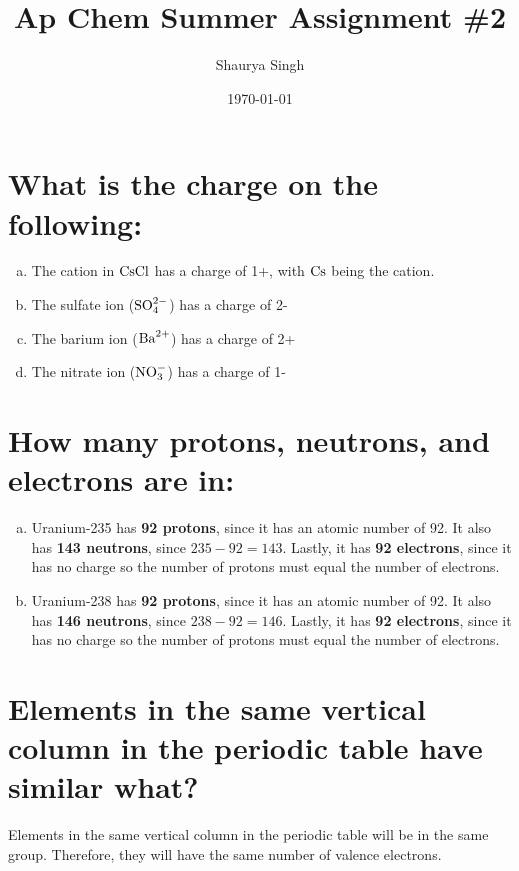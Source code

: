 \documentclass[11pt]{article}
\author{Shaurya Singh}
\date{\today}
\title{Ap Chem Summer Assignment \#2}
\begin{document}
\maketitle

\section{What is the charge on the following:}
\label{sec:org161f669}
\begin{enumerate}[(a)]
\item The cation in \(\ce{CsCl}\) has a charge of 1+, with \(\ce{Cs}\) being the cation.
\item The sulfate ion (\(\ce{SO^{2-}4}\)) has a charge of 2-
\item The barium ion (\(\ce{Ba^{2+}}\)) has a charge of 2+
\item The nitrate ion (\(\ce{NO^-3}\)) has a charge of 1-
\end{enumerate}

\section{How many protons, neutrons, and electrons are in:}
\label{sec:orga434b10}
\begin{enumerate}[(a)]
\item Uranium-235 has \textbf{92 protons}, since it has an atomic number of 92. It also has \textbf{143 neutrons}, since \(235-92=143\). Lastly, it has \textbf{92 electrons}, since it has no charge so the number of protons must equal the number of electrons.
\item Uranium-238 has \textbf{92 protons}, since it has an atomic number of 92. It also has \textbf{146 neutrons}, since \(238-92=146\). Lastly, it has \textbf{92 electrons}, since it has no charge so the number of protons must equal the number of electrons.
\end{enumerate}

\section{Elements in the same vertical column in the periodic table have similar what?}
\label{sec:orgf81f922}
Elements in the same vertical column in the periodic table will be in the same group. Therefore, they will have the same number of valence electrons.
\end{document}
